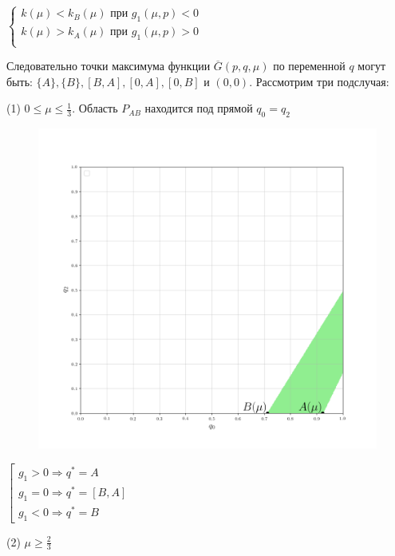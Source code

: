 \begin{flushleft}
	$
	\begin{cases}
	k(\mu) < k_B(\mu) \textrm{ при } g_1(\mu,p) < 0  \\
	k(\mu) > k_A(\mu) \textrm{ при } g_1(\mu,p) > 0 \\
	\end{cases}		
	$ 
	
	Следовательно точки максимума функции $\overline{G}(p,q,\mu)$ по переменной $q$
	могут быть: $\{A\}, \{B\}, [B, A], [0, A], [0,B]$ и $(0,0)$. Рассмотрим три подслучая:

	(1) $0 \leqslant \mu \leqslant \frac{1}{3}$. Область $P_{AB}$ находится под прямой
	$q_0=q_2$
	
		
	\begin{figure}[H]
		\centering
  		\includegraphics[scale=0.4]{images/graf_3_9}
  		\caption{}
	\end{figure}
	
	\begin{center}
		$\left[
		\begin{gathered}
			g_1 > 0 \Rightarrow q^*=A \\
			g_1 = 0 \Rightarrow q^*=[B,A] \\
			g_1 < 0 \Rightarrow q^*=B
		\end{gathered}
		\right.$	
	\end{center}
	
	(2) $\mu \geqslant \frac{2}{3}$
	

\end{flushleft}
